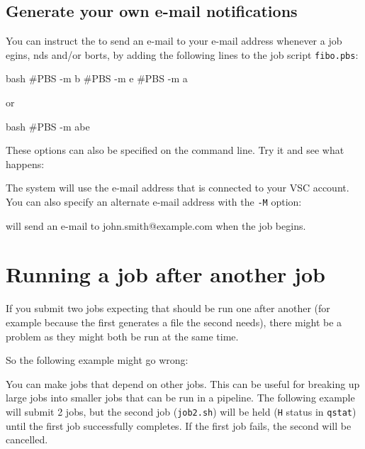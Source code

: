 \subsection{Generate your own e-mail notifications}

You can instruct the \hpc to send an e-mail to your e-mail address whenever a
job egins, nds and/or borts, by adding the
following lines to the job script \lstinline|fibo.pbs|:

\begin{code}{bash}
#PBS -m b
#PBS -m e
#PBS -m a
\end{code}
or
\begin{code}{bash}
#PBS -m abe
\end{code}

These options can also be specified on the command line.  Try it and see what
happens:

\begin{prompt}
\end{prompt}

The system will use the e-mail address that is connected to your VSC account.
You can also specify an alternate e-mail address with the \lstinline|-M| option:

\begin{prompt}
\end{prompt}

will send an e-mail to john.smith@example.com when the job begins.

\section{Running a job after another job}

If you submit two jobs expecting that should be run one after another (for example because
the first generates a file the second needs), there might be a problem as they might both be run at the same time.

So the following example might go wrong:

\begin{prompt}
\end{prompt}

You can make jobs that depend on other jobs. This can be useful for breaking up large jobs
into smaller jobs that can be run in a pipeline. The following example will submit 2 jobs,
but the second job (\lstinline|job2.sh|) will be held (\lstinline|H| status in \lstinline|qstat|)
until the first job successfully completes. If the first job fails, the second will be cancelled.

